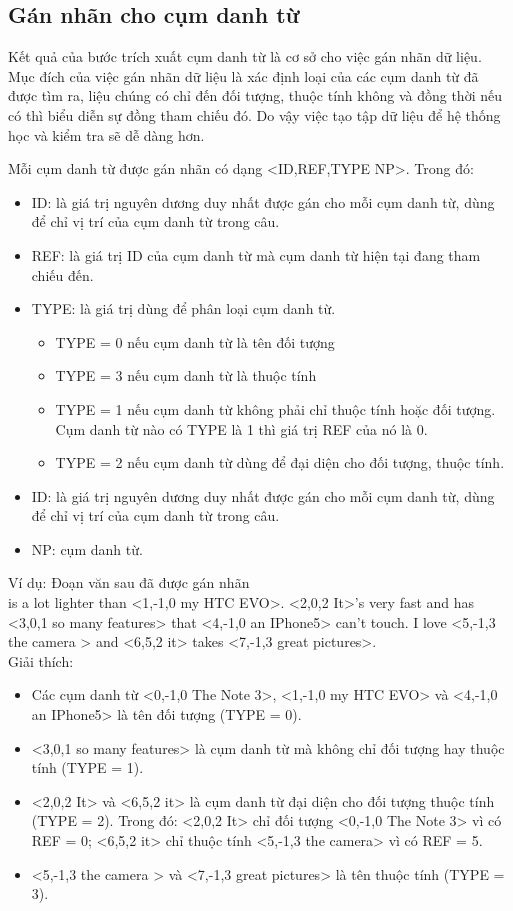 \documentclass[12pt]{report}
\begin{document}
			\subsection*{Gán nhãn cho cụm danh từ}
				\par Kết quả của bước trích xuất cụm danh từ là cơ sở cho việc gán nhãn dữ liệu. Mục đích của việc gán nhãn dữ liệu là xác định loại của các cụm danh từ đã được tìm ra, liệu chúng có chỉ đến đối tượng, thuộc tính không và đồng thời nếu có thì biểu diễn sự đồng tham chiếu đó. Do vậy việc tạo tập dữ liệu để hệ thống học và kiểm tra sẽ dễ dàng hơn.
				\par Mỗi cụm danh từ được gán nhãn có dạng <ID,REF,TYPE NP>. Trong đó:
					\begin{itemize}
						\item{ID: là giá trị nguyên dương duy nhất được gán cho mỗi cụm danh từ, dùng để chỉ vị trí của cụm danh từ trong câu.}
						\item{REF: là giá trị ID của cụm danh từ mà cụm danh từ hiện tại đang  tham chiếu đến.}
						\item{TYPE: là giá trị dùng để phân loại cụm danh từ. 
							\begin{itemize}
								\item{TYPE = 0 nếu cụm danh từ là tên đối tượng}
								\item{TYPE = 3 nếu cụm danh từ là thuộc tính}
								\item{TYPE = 1 nếu cụm danh từ không phải chỉ thuộc tính hoặc đối tượng. Cụm danh từ nào có TYPE là 1 thì giá trị REF của nó là 0.}
								\item{TYPE = 2 nếu cụm danh từ dùng để đại diện cho đối tượng, thuộc tính.}
							\end{itemize}}
						\item{ID: là giá trị nguyên dương duy nhất được gán cho mỗi cụm danh từ, dùng để chỉ vị trí của cụm danh từ trong câu.}
						\item{NP: cụm danh từ.}
					\end{itemize}
				\par Ví dụ: Đoạn văn sau đã được gán nhãn
					\\<0,-1,0 The Note 3> is a lot lighter than <1,-1,0 my HTC EVO>. <2,0,2 It>'s very fast and has <3,0,1 so many features> that <4,-1,0 an IPhone5> can't touch. I love <5,-1,3 the camera > and <6,5,2 it> takes <7,-1,3 great pictures>.
					\\Giải thích: 
					\begin{itemize}
						\item{Các cụm danh từ <0,-1,0 The Note 3>, <1,-1,0 my HTC EVO> và <4,-1,0 an IPhone5> là tên đối tượng (TYPE = 0).}
						\item{<3,0,1 so many features> là cụm danh từ mà không chỉ đối tượng hay thuộc tính (TYPE = 1).}
						\item{<2,0,2 It> và <6,5,2 it> là cụm danh từ đại diện cho đối tượng thuộc tính (TYPE = 2). Trong đó: <2,0,2 It> chỉ đối tượng <0,-1,0 The Note 3> vì có REF = 0; <6,5,2 it> chỉ thuộc tính <5,-1,3 the camera> vì có REF = 5.}
						\item{<5,-1,3 the camera > và <7,-1,3 great pictures> là tên thuộc tính (TYPE = 3).}
					\end{itemize} 
				
\end{document}
